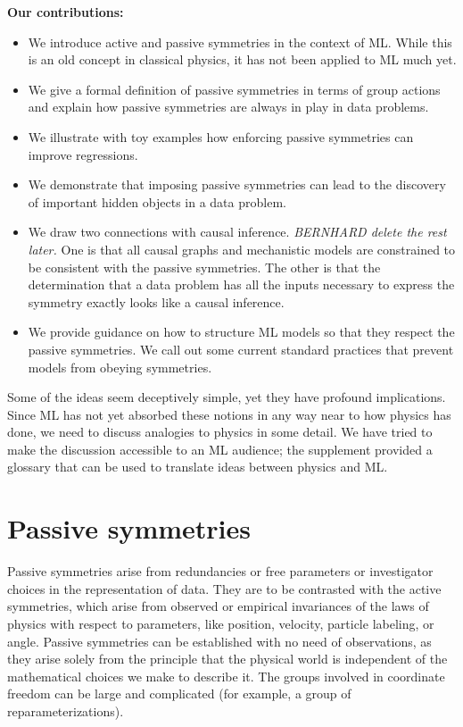 \documentclass{article}
\theoremstyle{plain}
\theoremstyle{definition}
\theoremstyle{remark}
\begin{document}
\textbf{Our contributions:}
\vspace{-2ex}\begin{itemize}
\parskip
\topsep 0pt
\partopsep 0pt
\parskip 0pt
\item
We introduce active and passive symmetries in the context of ML. While this is an old concept in classical physics, it has not been applied to ML much yet.
\item
We give a formal definition of passive symmetries in terms of group actions and explain how passive symmetries are always in play in data problems.
\item
We illustrate with toy examples how enforcing passive symmetries can improve regressions. 
\item
We demonstrate that imposing passive symmetries can lead to the discovery of important hidden objects in a data problem.
\item
We draw two connections with causal inference. {\em BERNHARD delete the rest later.}
One is that all causal graphs and mechanistic models are constrained to be consistent with the passive symmetries. The other is that the determination that a data problem has all the inputs necessary to express the symmetry exactly looks like a causal inference.
\item 
We provide guidance on how to structure ML models so that they respect the passive symmetries. We call out some current standard practices that prevent models from obeying symmetries. 
\end{itemize}\vspace{-2ex}
Some of the ideas seem deceptively simple, yet they have profound implications. Since ML has not yet absorbed these notions in any way near to how physics has done, we need to discuss analogies to physics in some detail. We have tried to make the discussion accessible to an ML audience; the supplement provided a glossary that can be used to translate ideas between physics and ML.


\section{Passive symmetries}\label{sec:informal}

Passive symmetries arise from redundancies or free parameters or investigator choices in the representation of data.
They are to be contrasted with the active symmetries, which arise from observed or empirical invariances of the laws of physics with respect to parameters, like position, velocity, particle labeling, or angle.
Passive symmetries can be established with no need of observations, as they arise solely from the principle that the physical world is independent of the mathematical choices we make to describe it.
The groups involved in coordinate freedom can be large and complicated (for example, a group of reparameterizations).
\end{document}
